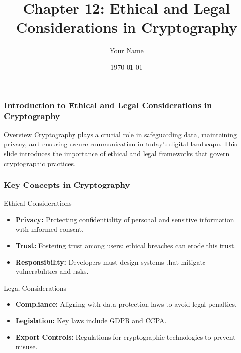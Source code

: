 \documentclass{beamer}
\title{Chapter 12: Ethical and Legal Considerations in Cryptography}
\author{Your Name}
\institute{Your Institution}
\date{\today}
\begin{document}
\frame{\titlepage}

\begin{frame}[fragile]
    \frametitle{Introduction to Ethical and Legal Considerations in Cryptography}
    \begin{block}{Overview}
        Cryptography plays a crucial role in safeguarding data, maintaining privacy, and ensuring secure communication in today’s digital landscape. 
        This slide introduces the importance of ethical and legal frameworks that govern cryptographic practices.
    \end{block}
\end{frame}

\begin{frame}[fragile]
    \frametitle{Key Concepts in Cryptography}
    \begin{block}{Ethical Considerations}
        \begin{itemize}
            \item \textbf{Privacy:} Protecting confidentiality of personal and sensitive information with informed consent.
            \item \textbf{Trust:} Fostering trust among users; ethical breaches can erode this trust.
            \item \textbf{Responsibility:} Developers must design systems that mitigate vulnerabilities and risks.
        \end{itemize}
    \end{block}
    
    \begin{block}{Legal Considerations}
        \begin{itemize}
            \item \textbf{Compliance:} Aligning with data protection laws to avoid legal penalties.
            \item \textbf{Legislation:} Key laws include GDPR and CCPA.
            \item \textbf{Export Controls:} Regulations for cryptographic technologies to prevent misuse.
        \end{itemize}
    \end{block}
\end{frame}
\end{document}
